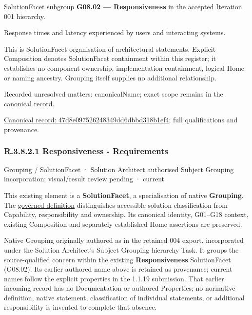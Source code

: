 SolutionFacet subgroup \textbf{G08.02 — Responsiveness} in the accepted Iteration 001 hierarchy.



Response times and latency experienced by users and interacting systems.



This is SolutionFacet organisation of architectural statements. Explicit Composition denotes SolutionFacet containment within this register; it establishes no component ownership, implementation containment, logical Home or naming ancestry. Grouping itself supplies no additional relationship.


{\small Recorded unresolved matters: canonicalName; exact scope remains in the canonical record.}\par
{\footnotesize \href{../../../../../../../continuum/grouping/47d8e097526248349dd6dbbd318b1ef4.md}{Canonical record: 47d8e097526248349dd6dbbd318b1ef4}; full qualifications and provenance.}\par
\subsubsection*{R.3.8.2.1 Responsiveness - Requirements}
\label{navigation:R.3.8.2.1}

\label{element:43ea78d2aa5e4e0eb4e0c80a6ddb22dd}
{\small Grouping / SolutionFacet · Solution Architect authorised Subject Grouping incorporation; visual/result review pending · current}\par

This existing element is a \textbf{SolutionFacet}, a specialisation of native
\textbf{Grouping}. The \href{\detokenize{../../../../../../../governance/continuum-representation.md#solutionfacet-classification--1119-candidate}}{governed definition}
distinguishes accessible solution classification from Capability, responsibility
and ownership. Its canonical identity, G01–G18 context, existing Composition
and separately established Home assertions are preserved.



Native Grouping originally authored as \texttt{} in the retained 004 export,
incorporated under the Solution Architect's Subject Grouping hierarchy Task.
It groups the source-qualified \texttt{} concern within
the existing \textbf{Responsiveness} SolutionFacet (G08.02). Its earlier authored name above is retained as provenance; current names
follow the explicit properties in the 1.1.19 submission.
That earlier incoming record has no Documentation or authored Properties; no normative
definition, native statement, classification of individual statements, or
additional responsibility is invented to complete that absence.



